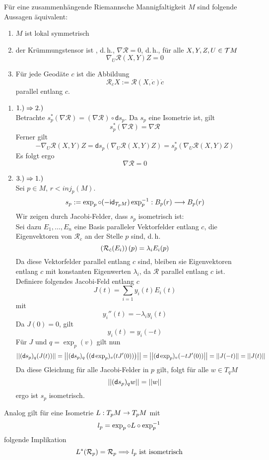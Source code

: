 \documentclass{book}
\renewcommand{\d}{\textsf{d}}
\newcommand{\Rc}{\mathcal{R}}
\begin{document}
\Satz{}
\label{180117}
Für eine zusammenhängende Riemannsche Mannigfaltigkeit $M$ sind folgende Aussagen äquivalent:
\begin{enumerate}[1.)]
\item $M$ ist lokal symmetrisch
\item der Krümmungstensor ist , d.\,h., $\nabla \Rc = 0$, d.\,h., für alle $X,Y,Z,U \in \mathcal{T} M$
\[ \nabla_U \Rc(X,Y)Z = 0 \]
\item Für jede Geodäte $c$ ist die Abbildung
\[ \Rc_{\dot{c}}X := \Rc(X, \dot{c})\dot{c} \]
parallel entlang $c$.
\end{enumerate}
\begin{Beweis}{}
\begin{enumerate}
\item $1.) \overset{}{\Rightarrow} 2.)$\\
Betrachte $s_p^*(\nabla \Rc) = (\nabla \Rc) \circ \d s_p$. Da $s_p$ eine Isometrie ist, gilt
\[ s_p^*(\nabla \Rc) = \nabla \Rc \]
Ferner gilt
\[ - \nabla_U \Rc(X,Y) Z = \d s_p (\nabla_U \Rc(X,Y) Z) = s_p^*(\nabla_U \Rc(X,Y) Z) \]
Es folgt ergo
\[ \nabla \Rc = 0 \]
\item $3.) \overset{}{\Rightarrow} 1.)$\\
Sei $p \in M$, $r < inj_p(M)$.
\[ s_p := \exp_p \circ (-\textsf{id}_{T_pM}) \exp_p^{-1} : B_p(r) \overset{}{\longrightarrow} B_p(r) \]
Wir zeigen durch Jacobi-Felder, dass $s_p$ isometrisch ist:\\
Sei dazu $E_1, \ldots, E_n$ eine Basis paralleler Vektorfelder entlang $c$, die Eigenvektoren von $\Rc_{\dot{c}}$ an der Stelle $p$ sind, d.\,h.
\[ \klam{\Rc_{\dot{c}}(E_i)} (p) = \lambda_i E_i(p) \]
Da diese Vektorfelder parallel entlang $c$ sind, bleiben sie Eigenvektoren entlang $c$ mit konstanten Eigenwerten $\lambda_i$, da $\Rc$ parallel entlang $c$ ist. Definiere folgendes Jacobi-Feld entlang $c$
\[ J(t) = \sum_{i = 1} y_i(t) E_i(t) \]
mit
\[ y_i''(t) = - \lambda_i y_i(t) \]
Da $J(0) = 0$, gilt
\[ y_i(t) = y_i(-t) \]
Für $J$ und $q = \exp_p(v)$ gilt nun
\[ \norm{ (\d s_p)_q (J(t)) } = \norm{ (\d s_p)_q \klam{ (\d \exp_p)_v (tJ'(0)) } } = \norm{ (\d \exp_p)_v (-tJ'(0)) } = \norm{J(-t)} = \norm{J(t)}  \]
Da diese Gleichung für alle Jacobi-Felder in $p$ gilt, folgt für alle $w \in T_qM$
\[ \norm{(\d s_p)_q w} = \norm{w} \]
ergo ist $s_p$ isometrisch.
\end{enumerate}
\end{Beweis}

\Bem{}
Analog gilt für eine Isometrie $L : T_pM \overset{}{\rightarrow} T_pM$ mit
\[l_p = \exp_p \circ L \circ \exp_p^{-1} \]
folgende Implikation
\[ L^*(\Rc_p) = \Rc_p \Impl{} l_p \text{ ist isometrisch} \] %
\end{document}
